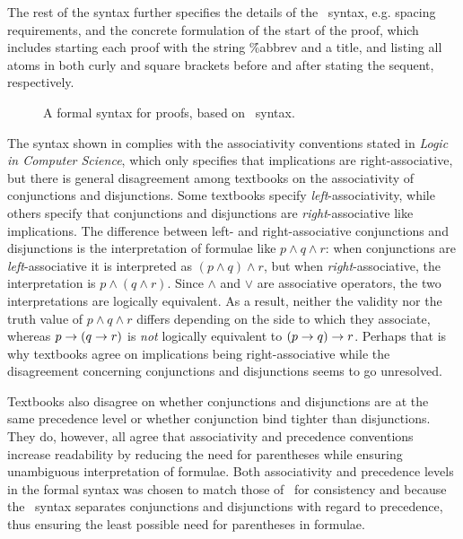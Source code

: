 \documentclass[BA.tex]{subfiles}
\begin{document}
 The rest of the syntax further 
 specifies the details of the \bp\ syntax, e.g. spacing requirements, and
 the concrete formulation of the start of the proof, which includes starting
 each proof with the string \f{\%abbrev} and a title, and listing all atoms
 in both curly and square
 brackets before and after stating the sequent, respectively.


\begin{figure}[H]

\caption[A {\bf formal} syntax for proofs]{A formal syntax for proofs, based on \bp\ syntax.}
\label{fproof}
\end{figure}


The syntax shown in  complies with the associativity 
conventions stated in \emph{Logic in Computer Science}\cite[p.~5]{hr}, which
only specifies that implications are right-associative, but there is
general disagreement among textbooks on the associativity of conjunctions
and disjunctions. Some textbooks specify 
\emph{left}-associativity\cite[p.~46]{disc}, while others specify that 
conjunctions and disjunctions are \emph{right}-associative like 
implications\cite[p.~11]{math}\cite[p.~5]{calc}. The difference between
left- and right-associative conjunctions and disjunctions is the
interpretation of formulae like \(p \land q \land r\): when conjunctions are
\emph{left}-associative it is interpreted as \((p \land q) \land r\), but
when \emph{right}-associative, the interpretation is \(p \land (q \land r)\).
Since \(\land\) and \(\lor\) are associative operators, the two 
interpretations are logically equivalent. 
As a result, neither the validity nor the truth value of
\(p \land q \land r\) differs depending on the side to which they
associate, whereas \(p \rightarrow (q \rightarrow r)\) is \emph{not} logically equivalent
to \((p \rightarrow q) \rightarrow r\). Perhaps that is why textbooks agree on implications
being right-associative while the disagreement concerning conjunctions and
disjunctions seems to go unresolved.

Textbooks also disagree on whether conjunctions and disjunctions
are at the same precedence level\cite{hr} or whether
conjunction bind tighter than
disjunctions\cite{math}\cite{calc}\cite{disc}. They do, however, all
agree that associativity and precedence conventions increase readability
by reducing the need for parentheses while ensuring unambiguous
interpretation of 
formulae\cite[p.~5]{hr}\cite[p.~46]{disc}\cite[p.~10]{math}\cite[p.~5]{calc}.
Both associativity and precedence levels in the formal syntax was chosen 
to match those of \bp\ for consistency and because the \bp\ syntax separates
conjunctions and disjunctions with regard to precedence, thus ensuring the
least possible need for parentheses in formulae.
\end{document}
